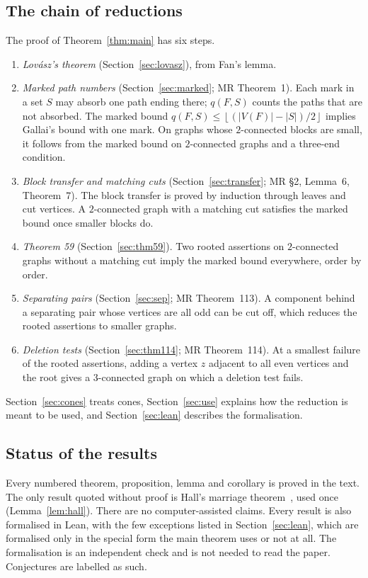 \documentclass[11pt]{amsart}
\theoremstyle{definition}
\theoremstyle{remark}
\renewcommand{\_}{\oldunderscore\allowbreak}
\newcommand{\fl}[1]{\left\lfloor #1\right\rfloor}
\begin{document}
\subsection*{The chain of reductions}
The proof of Theorem~\ref{thm:main} has six steps.
\begin{enumerate}[label=\arabic*.,leftmargin=2em]
\item \emph{Lov\'asz's theorem} (Section~\ref{sec:lovasz}), from Fan's lemma.
\item \emph{Marked path numbers} (Section~\ref{sec:marked}; MR Theorem~1). Each mark in a set $S$ may
absorb one path ending there; $q(F,S)$ counts the paths that are not absorbed. The marked bound
$q(F,S)\le\fl{(|V(F)|-|S|)/2}$ implies Gallai's bound with one mark. On graphs whose $2$-connected
blocks are small, it follows from the marked bound on $2$-connected graphs and a three-end condition.
\item \emph{Block transfer and matching cuts} (Section~\ref{sec:transfer}; MR \S2, Lemma~6,
Theorem~7). The block transfer is proved by induction through leaves and cut vertices. A
$2$-connected graph with a matching cut satisfies the marked bound once smaller blocks do.
\item \emph{Theorem 59} (Section~\ref{sec:thm59}). Two rooted assertions on $2$-connected graphs
without a matching cut imply the marked bound everywhere, order by order.
\item \emph{Separating pairs} (Section~\ref{sec:sep}; MR Theorem~113). A component behind a
separating pair whose vertices are all odd can be cut off, which reduces the rooted assertions to
smaller graphs.
\item \emph{Deletion tests} (Section~\ref{sec:thm114}; MR Theorem~114). At a smallest failure of the
rooted assertions, adding a vertex $z$ adjacent to all even vertices and the root gives a
$3$-connected graph on which a deletion test fails.
\end{enumerate}
Section~\ref{sec:cones} treats cones, Section~\ref{sec:use} explains how the reduction is meant to
be used, and Section~\ref{sec:lean} describes the formalisation.

\subsection*{Status of the results}
Every numbered theorem, proposition, lemma and corollary is proved in the text. The only result
quoted without proof is Hall's marriage theorem~\cite{Hall35}, used once
(Lemma~\ref{lem:hall}). There are no computer-assisted claims. Every result is also formalised in
Lean, with the few exceptions listed in Section~\ref{sec:lean}, which are formalised only in the
special form the main theorem uses or not at all. The formalisation is an independent check and is
not needed to read the paper. Conjectures are labelled as such.
\end{document}
